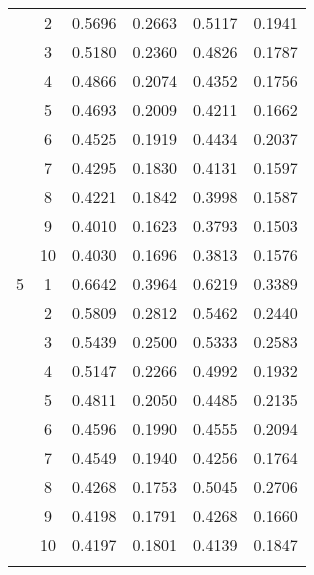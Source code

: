 \begin{center}
\begin{longtable}{|c|c|c|c|c|c|}
 & 2 & 0.5696 & 0.2663 & 0.5117 & 0.1941 \\
 & 3 & 0.5180 & 0.2360 & 0.4826 & 0.1787 \\
 & 4 & 0.4866 & 0.2074 & 0.4352 & 0.1756 \\
 & 5 & 0.4693 & 0.2009 & 0.4211 & 0.1662 \\
 & 6 & 0.4525 & 0.1919 & 0.4434 & 0.2037 \\
 & 7 & 0.4295 & 0.1830 & 0.4131 & 0.1597 \\
 & 8 & 0.4221 & 0.1842 & 0.3998 & 0.1587 \\
 & 9 & 0.4010 & 0.1623 & 0.3793 & 0.1503 \\
 & 10 & 0.4030 & 0.1696 & 0.3813 & 0.1576 \\
\hline
5 & 1 & 0.6642 & 0.3964 & 0.6219 & 0.3389 \\
 & 2 & 0.5809 & 0.2812 & 0.5462 & 0.2440 \\
 & 3 & 0.5439 & 0.2500 & 0.5333 & 0.2583 \\
 & 4 & 0.5147 & 0.2266 & 0.4992 & 0.1932 \\
 & 5 & 0.4811 & 0.2050 & 0.4485 & 0.2135 \\
 & 6 & 0.4596 & 0.1990 & 0.4555 & 0.2094 \\
 & 7 & 0.4549 & 0.1940 & 0.4256 & 0.1764 \\
 & 8 & 0.4268 & 0.1753 & 0.5045 & 0.2706 \\
 & 9 & 0.4198 & 0.1791 & 0.4268 & 0.1660 \\
 & 10 & 0.4197 & 0.1801 & 0.4139 & 0.1847 \\
\hline
\label{table:cnn}
\end{longtable}
\end{center}



